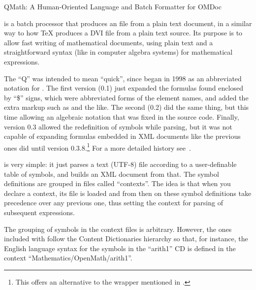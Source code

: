 
\begin{omgroup}[id=qmath,short=QMath Parser,creators=alberto]
  {QMath: A Human-Oriented Language and Batch Formatter for OMDoc}


{\qmath} is a batch processor that produces an {\omdoc} file from a plain {\unicode}
text document, in a similar way to how {\TeX} produces a DVI file from a plain
text source. Its purpose is to allow fast writing of mathematical
documents, using plain text and a straightforward syntax (like in computer algebra
systems) for mathematical expressions.

The ``Q'' was intended to mean ``quick'', since {\qmath} began in 1998 as an abbreviated
notation for {\mathml}. The first version (0.1) just expanded the formulas found enclosed
by ``{\$}'' signs, which were abbreviated forms of the {\mathml} element names, and added
the extra markup such as {} and the like. The second (0.2) did the same
thing, but this time allowing an algebraic notation that was fixed in the source code.
Finally, version 0.3 allowed the redefinition of symbols while parsing, but it was not
capable of expanding formulas embedded in XML documents like the previous ones did until
version 0.3.8.\footnote{\footnotesize{This offers an alternative to the {}
    wrapper mentioned in {}.}}  For a more detailed history
see~\cite{QMathHistory:URL}.

{\qmath} is very simple: it just parses a text (UTF-8) file according to a user-definable
table of symbols, and builds an XML document from that. The symbol definitions are grouped
in files called ``contexts''. The idea is that when you declare a context, its file is
loaded and from then on these symbol definitions take precedence over any previous one,
thus setting the context for parsing of subsequent expressions.

The grouping of symbols in the context files is arbitrary. However, the
ones included with {\qmath} follow the
{\openmath} Content Dictionaries hierarchy so that,
for instance, the English language syntax for the symbols in
the ``arith1'' CD is defined in the context ``Mathematics/OpenMath/arith1''.


\end{omgroup}
